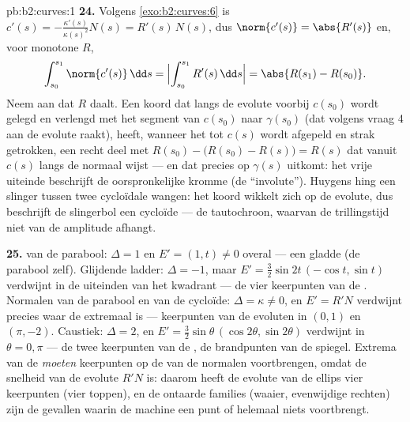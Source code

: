 \begin{solution}{pb:b2:curves:1}
\textbf{24.} Volgens \cref{exo:b2:curves:6} is $c'(s) =
-\frac{\kappa'(s)}{\kappa(s)^2}N(s) = R'(s)\,N(s)$, dus
$\norm{c'(s)} = \abs{R'(s)}$ en, voor monotone $R$,
\[
\int_{s_0}^{s_1}\norm{c'(s)}\,\dd s =
\Bigl|\int_{s_0}^{s_1}R'(s)\,\dd s\Bigr| = \abs{R(s_1) -
R(s_0)} .
\]
Neem aan dat $R$ daalt. Een koord dat langs de evolute voorbij
$c(s_0)$ wordt gelegd en verlengd met het segment van $c(s_0)$ naar
$\gamma(s_0)$ (dat volgens vraag 4 aan de evolute raakt), heeft,
wanneer het tot $c(s)$ wordt afgepeld en strak getrokken, een recht
deel met  $R(s_0) - \bigl(R(s_0) - R(s)\bigr) = R(s)$ dat
vanuit $c(s)$ langs de normaal wijst --- en dat precies op
$\gamma(s)$ uitkomt: het vrije uiteinde beschrijft de
oorspronkelijke kromme (de ``involute''). Huygens hing een slinger
tussen twee cycloïdale wangen: het koord wikkelt zich op de
evolute, dus beschrijft de slingerbol een cycloïde --- de
tautochroon, waarvan de trillingstijd niet van de amplitude
afhangt.

\textbf{25.}  van de parabool: $\Delta = 1$ en $E' = (1,
t) \neq 0$ overal --- een gladde  (de parabool zelf).
Glijdende ladder: $\Delta = -1$, maar $E' = \tfrac32\sin 2t\,(-\cos
t, \sin t)$ verdwijnt in de uiteinden van het kwadrant --- de vier
keerpunten van de . Normalen van de parabool en van de
cycloïde: $\Delta = \kappa \neq 0$, en $E' = R'N$ verdwijnt precies
waar de  extremaal is --- keerpunten van de evoluten in
$(0,1)$ en $(\pi, -2)$. Caustiek: $\Delta = 2$, en $E' =
\tfrac32\sin\theta\,(\cos2\theta, \sin2\theta)$ verdwijnt in
$\theta = 0, \pi$ --- de twee keerpunten van de , de
brandpunten van de spiegel. Extrema van de  \emph{moeten}
keerpunten op de  van de normalen voortbrengen, omdat de
snelheid van de evolute $R'N$ is: daarom heeft de evolute van de
ellips vier keerpunten (vier toppen), en de ontaarde families
(waaier, evenwijdige rechten) zijn de gevallen waarin de machine
een punt of helemaal niets voortbrengt.
\end{solution}
